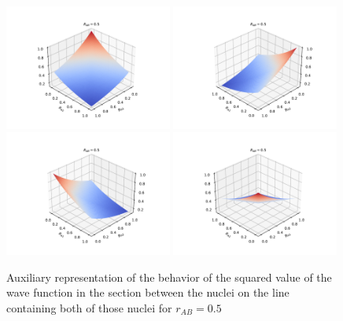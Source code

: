 \documentclass{pracalicmgr}
\begin{document}
\begin{figure}[H]
    \center
    \includegraphics[width=0.49\textwidth]{0,5 (2).pdf}
    \includegraphics[width=0.49\textwidth]{0,5 (3).pdf}
    \includegraphics[width=0.49\textwidth]{0,5 (1).pdf}
    \includegraphics[width=0.49\textwidth]{0,5 (4).pdf}
    \caption{
        Auxiliary representation of the behavior of the squared value of the wave function in the section between the nuclei on the line containing both of those nuclei for $r_{AB} = 0.5$}
    \label{wave 0.5}
\end{figure}
\end{document}
